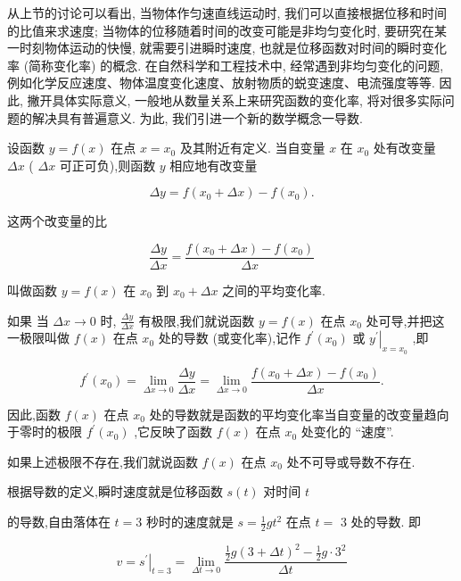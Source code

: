 \documentclass[lang=cn,newtx,10pt,scheme=chinese]{elegantbook}
\begin{document}
从上节的讨论可以看出, 当物体作匀速直线运动时, 我们可以直接根据位移和时间的比值来求速度; 当物体的位移随着时间的改变可能是非均匀变化时, 要研究在某一时刻物体运动的快慢, 就需要引进瞬时速度, 也就是位移函数对时间的瞬时变化率 (简称变化率) 的概念. 在自然科学和工程技术中, 经常遇到非均匀变化的问题, 例如化学反应速度、物体温度变化速度、放射物质的蜕变速度、电流强度等等. 因此, 撇开具体实际意义, 一般地从数量关系上来研究函数的变化率, 将对很多实际问题的解决具有普遍意义. 为此, 我们引进一个新的数学概念一导数.

设函数 \(y = f\left( x\right)\) 在点 \(x = {x}_{0}\) 及其附近有定义. 当自变量 \(x\) 在 \({x}_{0}\) 处有改变量 \({\Delta x}\) ( \({\Delta x}\) 可正可负),则函数 \(y\) 相应地有改变量

\[
{\Delta y} = f\left( {{x}_{0} + {\Delta x}}\right) - f\left( {x}_{0}\right) .
\]

这两个改变量的比

\[
\frac{\Delta y}{\Delta x} = \frac{f\left( {{x}_{0} + {\Delta x}}\right) - f\left( {x}_{0}\right) }{\Delta x}
\]

叫做函数 \(y = f\left( x\right)\) 在 \({x}_{0}\) 到 \({x}_{0} + {\Delta x}\) 之间的平均变化率.

如果 当 \({\Delta x} \rightarrow 0\) 时, \(\frac{\Delta y}{\Delta x}\) 有极限,我们就说函数 \(y = f\left( x\right)\) 在点 \({x}_{0}\) 处可导,并把这一极限叫做 \(f\left( x\right)\) 在点 \({x}_{0}\) 处的导数 (或变化率),记作 \({f}^{\prime }\left( {x}_{0}\right)\) 或 \({\left. {y}^{\prime }\right| }_{x = {x}_{0}}\) ,即

\[
{f}^{\prime }\left( {x}_{0}\right) = \mathop{\lim }\limits_{{{\Delta x} \rightarrow 0}}\frac{\Delta y}{\Delta x} = \mathop{\lim }\limits_{{{\Delta x} \rightarrow 0}}\frac{f\left( {{x}_{0} + {\Delta x}}\right) - f\left( {x}_{0}\right) }{\Delta x}. \tag{1}
\]

因此,函数 \(f\left( x\right)\) 在点 \({x}_{0}\) 处的导数就是函数的平均变化率当自变量的改变量趋向于零时的极限 \({f}^{\prime }\left( {x}_{0}\right)\) ,它反映了函数 \(f\left( x\right)\) 在点 \({x}_{0}\) 处变化的 “速度”.

如果上述极限不存在,我们就说函数 \(f\left( x\right)\) 在点 \({x}_{0}\) 处不可导或导数不存在.

根据导数的定义,瞬时速度就是位移函数 \(s\left( t\right)\) 对时间 \(t\)

的导数,自由落体在 \(t = 3\) 秒时的速度就是 \(s = \frac{1}{2}g{t}^{2}\) 在点 \(t =\) 3 处的导数. 即

\[
v = {\left. {s}^{\prime }\right| }_{t = 3} = \mathop{\lim }\limits_{{{\Delta t} \rightarrow 0}}\frac{\frac{1}{2}g{\left( 3 + \Delta t\right) }^{2} - \frac{1}{2}g \cdot {3}^{2}}{\Delta t}
\]
\end{document}
